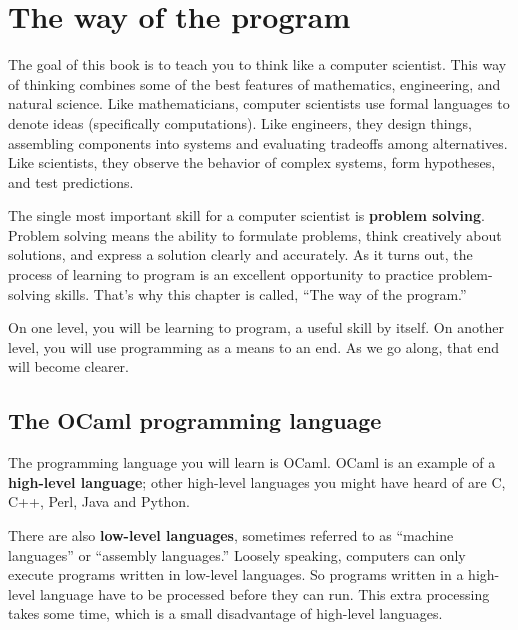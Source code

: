 \documentclass[10pt]{book}
\begin{document}
\begin{latexonly}

\tableofcontents

\clearemptydoublepage

\end{latexonly}

\mainmatter


\chapter{The way of the program}

The goal of this book is to teach you to think like a
computer scientist.  This way of thinking combines some of the best features
of mathematics, engineering, and natural science.  Like mathematicians,
computer scientists use formal languages to denote ideas (specifically
computations).  Like engineers, they design things, assembling components
into systems and evaluating tradeoffs among alternatives.  Like scientists,
they observe the behavior of complex systems, form hypotheses, and test
predictions.


The single most important skill for a computer scientist is {\bf
problem solving}.  Problem solving means the ability to formulate
problems, think creatively about solutions, and express a solution clearly
and accurately.  As it turns out, the process of learning to program is an
excellent opportunity to practice problem-solving skills.  That's why
this chapter is called, ``The way of the program.''

On one level, you will be learning to program, a useful
skill by itself.  On another level, you will use programming as a means to
an end.  As we go along, that end will become clearer.

\section{The OCaml programming language}

The programming language you will learn is OCaml. OCaml is
an example of a {\bf high-level language}; other high-level languages
you might have heard of are C, C++, Perl, Java and Python.

There are also {\bf low-level languages}, sometimes referred to as ``machine
languages'' or ``assembly languages.''  Loosely speaking, computers
can only execute programs written in low-level languages.  So
programs written in a high-level language have to be processed before
they can run.  This extra processing takes some time, which is a small
disadvantage of high-level languages.
\end{document}
